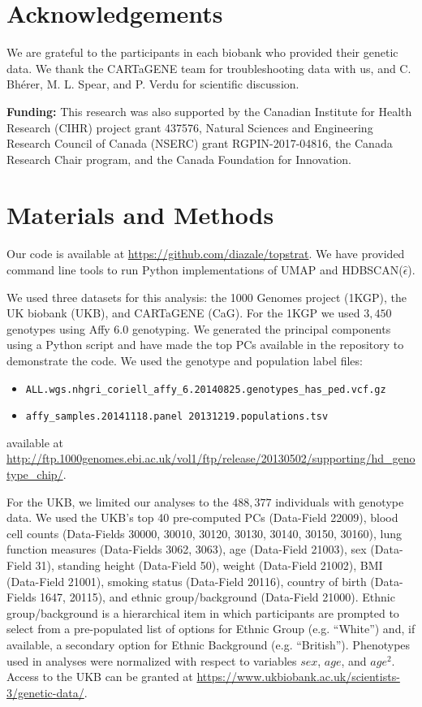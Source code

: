 \section{Acknowledgements}
We are grateful to the participants in each biobank who provided their genetic data. We thank the CARTaGENE team for troubleshooting data with us, and C. Bh\'{e}rer, M. L. Spear, and P. Verdu for scientific discussion.

\textbf{Funding:} This research was also supported by the Canadian Institute for Health Research (CIHR) project grant 437576, Natural Sciences and Engineering Research Council of Canada (NSERC) grant RGPIN-2017-04816, the Canada Research Chair program, and the Canada Foundation for Innovation.

\section{Materials and Methods}
Our code is available at \url{https://github.com/diazale/topstrat}. We have provided command line tools to run Python implementations of UMAP and HDBSCAN($\hat{\epsilon}$).

We used three datasets for this analysis: the 1000 Genomes project (1KGP), the UK biobank (UKB), and CARTaGENE (CaG). For the 1KGP we used $3,450$ genotypes using Affy 6.0 genotyping\citep{global_2015}. We generated the principal components using a Python script and have made the top PCs available in the repository to demonstrate the code. We used the genotype and population label files:
\begin{itemize}
\item \verb|ALL.wgs.nhgri_coriell_affy_6.20140825.genotypes_has_ped.vcf.gz| 
\item \verb|affy_samples.20141118.panel 20131219.populations.tsv|
\end{itemize}

available at \url{http://ftp.1000genomes.ebi.ac.uk/vol1/ftp/release/20130502/supporting/hd_genotype_chip/}.

For the UKB, we limited our analyses to the $488,377$ individuals with genotype data. We used the UKB's top 40 pre-computed PCs (Data-Field 22009), blood cell counts (Data-Fields 30000, 30010, 30120, 30130, 30140, 30150, 30160), lung function measures (Data-Fields 3062, 3063), age (Data-Field 21003), sex (Data-Field 31), standing height (Data-Field 50), weight (Data-Field 21002), BMI (Data-Field 21001), smoking status (Data-Field 20116), country of birth (Data-Fields 1647, 20115), and ethnic group/background (Data-Field 21000). Ethnic group/background is a hierarchical item in which participants are prompted to select from a pre-populated list of options for Ethnic Group (e.g. ``White'') and, if available, a secondary option for Ethnic Background (e.g. ``British''). Phenotypes used in analyses were normalized with respect to variables $sex$, $age$, and $age^2$. Access to the UKB can be granted at 
\url{https://www.ukbiobank.ac.uk/scientists-3/genetic-data/}.

